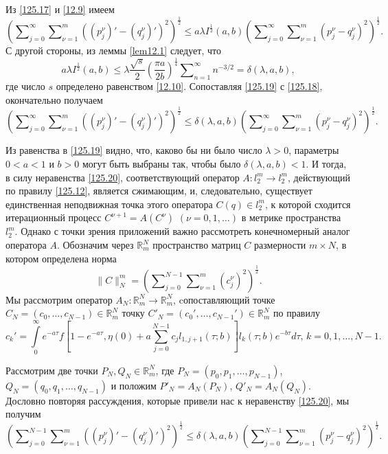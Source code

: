 Из  \eqref{125.17}  и \eqref{12.9} имеем
\begin{equation}\label{125.18}
\left(\sum\nolimits_{j=0}^\infty\sum\nolimits_{\nu=1}^m((p^\nu_j)'-(q^\nu_j)')^2\right)^\frac12\le a\lambda I^\frac12(a,b) \left(\sum\nolimits_{j=0}^\infty\sum\nolimits_{\nu=1}^m( p^\nu_j-q^\nu_j)^2\right)^\frac12.
\end{equation}
С другой стороны, из леммы \ref{lem12.1} следует, что
\begin{equation}\label{125.19}
a\lambda I^\frac12(a,b)\le\lambda \frac{\sqrt{s}}2\left(\frac{\pi a}{2b}\right)^\frac14 \sum\nolimits_{n=1}^\infty n^{-3/2}=\delta(\lambda,a,b),
\end{equation}
где число $s$ определено равенством \eqref{12.10}. Сопоставляя \eqref{125.19} с \eqref{125.18}, окончательно получаем
\begin{equation}\label{125.20}
\left(\sum\nolimits_{j=0}^\infty\sum\nolimits_{\nu=1}^m((p^\nu_j)'-(q^\nu_j)')^2\right)^\frac12\le \delta(\lambda,a,b)\left(\sum\nolimits_{j=0}^\infty\sum\nolimits_{\nu=1}^m( p^\nu_j-q^\nu_j)^2\right)^\frac12.
\end{equation}

Из равенства в \eqref{125.19} видно, что, каково бы ни было число $\lambda>0$, параметры $0<a<1$ и $b>0$ могут быть выбраны так, чтобы было $\delta(\lambda,a,b)<1$. И тогда, в силу неравенства \eqref{125.20}, соответствующий оператор $A:l^m_2\to l_2^m$, действующий по правилу \eqref{125.12}, является сжимающим, и, следовательно, существует единственная неподвижная точка этого оператора $C(q)\in l^m_2$, к которой сходится итерационный процесс $C^{\nu+1}=A(C^\nu)$ $(\nu=0,1,\ldots)$ в метрике пространства $l^m_2$.
Однако с точки зрения приложений важно рассмотреть конечномерный аналог оператора $A$. Обозначим через $\mathbb{R}^N_m$ пространство матриц $C$ размерности $m\times N$, в котором определена норма
$$\|C\|_N^m=\left(\sum\nolimits_{j=0}^{N-1} \sum\nolimits_{\nu=1}^{m}(c_j^\nu)^2\right)^\frac12.$$
Мы рассмотрим оператор $A_N:\mathbb{R}^N_m\to \mathbb{R}^N_m$, cопоставляющий точке $C_N=(c_0,\ldots,c_{N-1})\in \mathbb{R}^N_m $ точку  $C'_N=(c_0',\ldots,c_{N-1}')\in \mathbb{R}^N_m $ по правилу
\begin{equation}\label{125.21}
c_k'=\int\limits_{0}^\infty e^{-a\tau}f\left[1-e^{-a\tau},\eta(0)+ a\sum_{j=0}^{N-1} c_jl_{1,j+1}(\tau;b)\right]l_k(\tau;b)e^{-b\tau} d\tau,\,k=0,1,\ldots, N-1.
\end{equation}

Рассмотрим две точки $P_N,Q_N\in \mathbb{R}^N_m$, где $P_N=(p_0,p_1,\ldots, p_{N-1})$, $Q_N=(q_0,q_1,\ldots, q_{N-1})$ и положим $P'_N=A_N(P_N)$, $Q'_N=A_N(Q_N)$. Дословно повторяя рассуждения, которые привели нас к неравенству \eqref{125.20}, мы получим
\begin{equation}\label{125.22}
\left(\sum\nolimits_{j=0}^{N-1}\sum\nolimits_{\nu=1}^m((p^\nu_j)'-(q^\nu_j)')^2\right)^\frac12\le \delta(\lambda,a,b)\left(\sum\nolimits_{j=0}^{N-1}\sum\nolimits_{\nu=1}^m( p^\nu_j-q^\nu_j)^2\right)^\frac12.
\end{equation}

